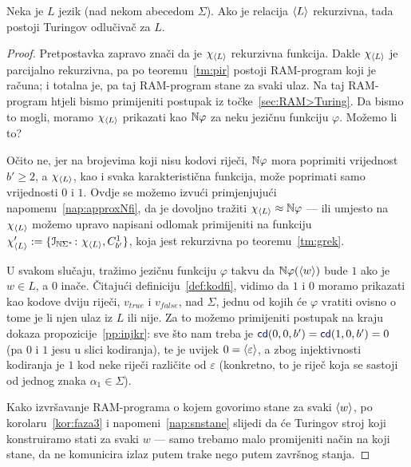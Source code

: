 \begin{teorem}\label{tm:krio}
Neka je $L$ jezik (nad nekom abecedom $\Sigma$). Ako je relacija $\langle L\rangle$ rekurzivna, tada postoji Turingov odlučivač za $L$.
\end{teorem}
\begin{proof}
Pretpostavka zapravo znači da je $\chi_{\langle L\rangle}$ rekurzivna funkcija. Dakle $\chi_{\langle L\rangle}$ je parcijalno rekurzivna, pa po teoremu~\ref{tm:pir} postoji RAM-program koji je računa; i totalna je, pa taj RAM-program stane za svaki ulaz. Na taj RAM-program htjeli bismo primijeniti postupak iz točke~\ref{sec:RAM>Turing}. Da bismo to mogli, moramo $\chi_{\langle L\rangle}$ prikazati kao ${\mathbb N}\varphi$ za neku jezičnu funkciju $\varphi$. Možemo li to?

Očito ne, jer na brojevima koji nisu kodovi riječi, ${\mathbb N}\varphi$ mora poprimiti vrijednost $b'\ge2$, a $\chi_{\langle L\rangle}$, kao i svaka karakteristična funkcija, može poprimati samo vrijednosti $0$ i $1$. Ovdje se možemo izvući primjenjujući napomenu~\ref{nap:approxNfi}, da je dovoljno tražiti $\chi_{\langle L\rangle}\approx{\mathbb N}\varphi$ --- ili umjesto na $\chi_{\langle L\rangle}$ možemo upravo napisani odlomak primijeniti na funkciju $\chi_{\langle L\rangle}':=\{\mathcal I_{{\mathbb N}\Sigma^*}\colon\chi_{\langle L\rangle},C_{b'}^1\}$, koja jest rekurzivna po teoremu~\ref{tm:grek}.

U svakom slučaju, tražimo jezičnu funkciju $\varphi$ takvu da ${\mathbb N}\varphi(\langle w\rangle)$ bude $1$ ako je $w\in L$, a $0$ inače. Čitajući definiciju~\ref{def:kodfi}, vidimo da $1$ i $0$ moramo prikazati kao kodove dviju riječi, $v_\mathit{true}$ i $v_\mathit{false}$, nad $\Sigma$, jednu od kojih će $\varphi$ vratiti ovisno o tome je li njen ulaz iz $L$ ili nije. Za to možemo primijeniti postupak na kraju dokaza propozicije~\ref{pp:injkr}: sve što nam treba je $\f{cd}(0,0,b')=\f{cd}(1,0,b')=0$ (pa $0$ i $1$ jesu u slici kodiranja), te je uvijek $0=\langle\varepsilon\rangle$, a zbog injektivnosti kodiranja je $1$ kod neke riječi različite od $\varepsilon$ (konkretno, to je riječ koja se sastoji od jednog znaka $\alpha_1\in\Sigma$).

Kako izvršavanje RAM-programa o kojem govorimo stane za svaki $\langle w\rangle$, po korolaru~\ref{kor:faza3} i napomeni~\ref{nap:snstane} slijedi da će Turingov stroj koji konstruiramo stati za svaki $w$ --- samo trebamo malo promijeniti način na koji stane, da ne komunicira izlaz putem trake nego putem završnog stanja.


\end{proof}
